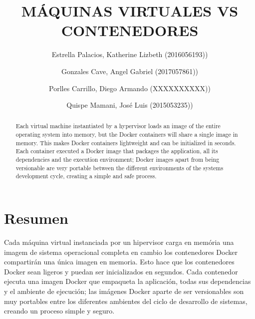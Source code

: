 \documentclass[preprint,12pt]{elsarticle}
\begin{document}
	
	\begin{frontmatter} 

		\title{\huge MÁQUINAS VIRTUALES VS CONTENEDORES}
		
		\author{Estrella Palacios, Katherine Lizbeth              	(2016056193))}
		\author{Gonzales Cave, Angel Gabriel              	        (2017057861))}
		\author{Porlles Carrillo, Diego Armando	         	(XXXXXXXXXX))} %
		\author{Quispe Mamani, José Luis             		(2015053235))} %
		\address{Escuela Profesional de Ingeniería de Sistemas}
		\address{Universidad Privada de Tacna}
		\address{Tacna, Perú}
		

		\begin{abstract}	
Each virtual machine instantiated by a hypervisor loads an image of the entire operating system into memory, but the Docker containers will share a single image in memory. This makes Docker containers lightweight and can be initialized in seconds. Each container executed a Docker image that packages the application, all its dependencies and the execution environment; Docker images apart from being versionable are very portable between the different environments of the systems development cycle, creating a simple and safe process.

		\end{abstract}


	\end{frontmatter}


\section{Resumen}
Cada máquina virtual instanciada por un hipervisor carga en memória una imagem de sistema operacional completa en cambio los contenedores Docker compartirán una única imagen en memoria. Esto hace que los contenedores Docker sean ligeros y puedan ser inicializados en segundos. Cada contenedor ejecuta una imagen Docker que empaqueta la aplicación, todas sus dependencias y el ambiente de ejecución; las imágenes Docker aparte de ser versionables son muy portables entre los diferentes ambientes del ciclo de desarrollo de sistemas, creando un proceso simple y seguro. 
\end{document}

